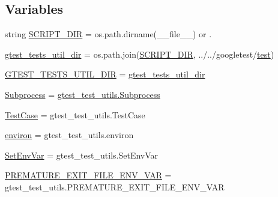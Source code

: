 \subsection*{Variables}
\begin{DoxyCompactItemize}
\item 
string \mbox{\hyperlink{namespacegoogletest-master_1_1googlemock_1_1test_1_1gmock__test__utils_a99d9d8eaf10689f78cd3d580fcf68fc3}{S\+C\+R\+I\+P\+T\+\_\+\+D\+IR}} = os.\+path.\+dirname(\+\_\+\+\_\+file\+\_\+\+\_\+) or \textquotesingle{}.\textquotesingle{}
\item 
\mbox{\hyperlink{namespacegoogletest-master_1_1googlemock_1_1test_1_1gmock__test__utils_ace7bae756171f110e31b17b55eda0b84}{gtest\+\_\+tests\+\_\+util\+\_\+dir}} = os.\+path.\+join(\mbox{\hyperlink{namespacegoogletest-master_1_1googlemock_1_1test_1_1gmock__test__utils_a99d9d8eaf10689f78cd3d580fcf68fc3}{S\+C\+R\+I\+P\+T\+\_\+\+D\+IR}}, \textquotesingle{}../../googletest/\mbox{\hyperlink{_mutual_8h_a707ee03719e99670bf6cfdfd897b8456}{test}}\textquotesingle{})
\item 
\mbox{\hyperlink{namespacegoogletest-master_1_1googlemock_1_1test_1_1gmock__test__utils_addcc8e7901df8fb490b05ec18577f6a9}{G\+T\+E\+S\+T\+\_\+\+T\+E\+S\+T\+S\+\_\+\+U\+T\+I\+L\+\_\+\+D\+IR}} = \mbox{\hyperlink{namespacegoogletest-master_1_1googlemock_1_1test_1_1gmock__test__utils_ace7bae756171f110e31b17b55eda0b84}{gtest\+\_\+tests\+\_\+util\+\_\+dir}}
\item 
\mbox{\hyperlink{namespacegoogletest-master_1_1googlemock_1_1test_1_1gmock__test__utils_a9b18c328989544633dae206ad3ee4f45}{Subprocess}} = \mbox{\hyperlink{classgtest__test__utils_1_1_subprocess}{gtest\+\_\+test\+\_\+utils.\+Subprocess}}
\item 
\mbox{\hyperlink{namespacegoogletest-master_1_1googlemock_1_1test_1_1gmock__test__utils_af62efb18b8733ce3967c0f25703b95cb}{Test\+Case}} = gtest\+\_\+test\+\_\+utils.\+Test\+Case
\item 
\mbox{\hyperlink{namespacegoogletest-master_1_1googlemock_1_1test_1_1gmock__test__utils_a07a046097af538f36086ff7b4d32d947}{environ}} = gtest\+\_\+test\+\_\+utils.\+environ
\item 
\mbox{\hyperlink{namespacegoogletest-master_1_1googlemock_1_1test_1_1gmock__test__utils_a766f689597f40a03a04a59fd6c44c5e5}{Set\+Env\+Var}} = gtest\+\_\+test\+\_\+utils.\+Set\+Env\+Var
\item 
\mbox{\hyperlink{namespacegoogletest-master_1_1googlemock_1_1test_1_1gmock__test__utils_ab276fcd8122690994599640644132920}{P\+R\+E\+M\+A\+T\+U\+R\+E\+\_\+\+E\+X\+I\+T\+\_\+\+F\+I\+L\+E\+\_\+\+E\+N\+V\+\_\+\+V\+AR}} = gtest\+\_\+test\+\_\+utils.\+P\+R\+E\+M\+A\+T\+U\+R\+E\+\_\+\+E\+X\+I\+T\+\_\+\+F\+I\+L\+E\+\_\+\+E\+N\+V\+\_\+\+V\+AR
\end{DoxyCompactItemize}


